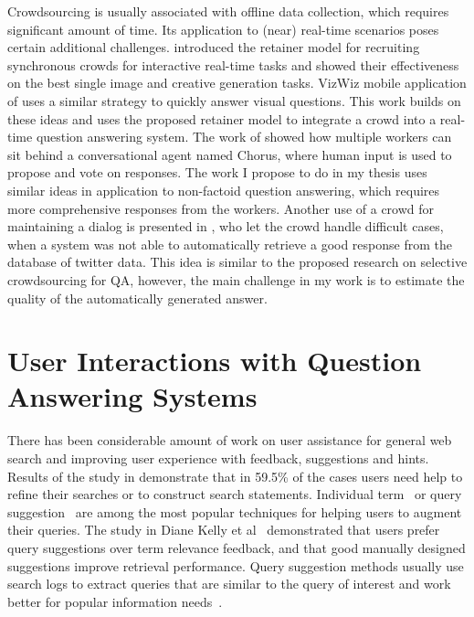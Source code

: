 Crowdsourcing is usually associated with offline data collection, which requires significant amount of time.
Its application to (near) real-time scenarios poses certain additional challenges.
\cite{bernstein2011crowds} introduced the retainer model for recruiting synchronous crowds for interactive real-time tasks and showed their effectiveness on the best single image and creative generation tasks.
VizWiz mobile application of \cite{bigham2010vizwiz} uses a similar strategy to quickly answer visual questions.
This work builds on these ideas and uses the proposed retainer model to integrate a crowd into a real-time question answering system.
The work of \cite{Lasecki:2013:CCC:2501988.2502057,huang2015guardian} showed how multiple workers can sit behind a conversational agent named Chorus, where human input is used to propose and vote on responses.
The work I propose to do in my thesis uses similar ideas in application to non-factoid question answering, which requires more comprehensive responses from the workers.
Another use of a crowd for maintaining a dialog is presented in \cite{Bessho:2012:DSU:2392800.2392841}, who let the crowd handle difficult cases, when a system was not able to automatically retrieve a good response from the database of twitter data.
This idea is similar to the proposed research on selective crowdsourcing for QA, however, the main challenge in my work is to estimate the quality of the automatically generated answer.

\section{User Interactions with Question Answering Systems}
\label{section:relatedwork:user}

There has been considerable amount of work on user assistance for general web search and improving user experience with feedback, suggestions and hints.
Results of the study in \cite{xie2009understanding} demonstrate that in 59.5\% of the cases users need help to refine their searches or to construct search statements.
Individual term~\cite{ruthven2003survey} or query suggestion~\cite{Bhatia:2011:QSA:2009916.2010023, Cao:2008:CQS:1401890.1401995,Jones:2006:GQS:1135777.1135835} are among the most popular techniques for helping users to augment their queries.
The study in Diane Kelly et al~\cite{Kelly:2009:CQT:1571941.1572006} demonstrated that users prefer query suggestions over term relevance feedback, and that good manually designed suggestions improve retrieval performance.
Query suggestion methods usually use search logs to extract queries that are similar to the query of interest and work better for popular information needs~\cite{Bhatia:2011:QSA:2009916.2010023}.

